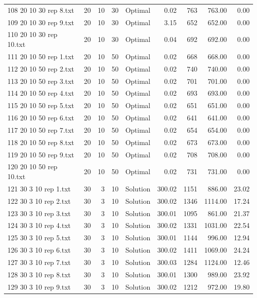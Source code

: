 \begin{longtable}{lrrllrrrr}
108 20 10 30 rep 8.txt & 20 & 10 & 30 & Optimal &  0.02 & 763 & 763.00 &  0.00\\
109 20 10 30 rep 9.txt & 20 & 10 & 30 & Optimal &  3.15 & 652 & 652.00 &  0.00\\
110 20 10 30 rep 10.txt & 20 & 10 & 30 & Optimal &  0.04 & 692 & 692.00 &  0.00\\
111 20 10 50 rep 1.txt & 20 & 10 & 50 & Optimal &  0.02 & 668 & 668.00 &  0.00\\
112 20 10 50 rep 2.txt & 20 & 10 & 50 & Optimal &  0.02 & 740 & 740.00 &  0.00\\
113 20 10 50 rep 3.txt & 20 & 10 & 50 & Optimal &  0.02 & 701 & 701.00 &  0.00\\
114 20 10 50 rep 4.txt & 20 & 10 & 50 & Optimal &  0.02 & 693 & 693.00 &  0.00\\
115 20 10 50 rep 5.txt & 20 & 10 & 50 & Optimal &  0.02 & 651 & 651.00 &  0.00\\
116 20 10 50 rep 6.txt & 20 & 10 & 50 & Optimal &  0.02 & 641 & 641.00 &  0.00\\
117 20 10 50 rep 7.txt & 20 & 10 & 50 & Optimal &  0.02 & 654 & 654.00 &  0.00\\
118 20 10 50 rep 8.txt & 20 & 10 & 50 & Optimal &  0.02 & 673 & 673.00 &  0.00\\
119 20 10 50 rep 9.txt & 20 & 10 & 50 & Optimal &  0.02 & 708 & 708.00 &  0.00\\
120 20 10 50 rep 10.txt & 20 & 10 & 50 & Optimal &  0.02 & 731 & 731.00 &  0.00\\
121 30 3 10 rep 1.txt & 30 & 3 & 10 & Solution & 300.02 & 1151 & 886.00 & 23.02\\
122 30 3 10 rep 2.txt & 30 & 3 & 10 & Solution & 300.02 & 1346 & 1114.00 & 17.24\\
123 30 3 10 rep 3.txt & 30 & 3 & 10 & Solution & 300.01 & 1095 & 861.00 & 21.37\\
124 30 3 10 rep 4.txt & 30 & 3 & 10 & Solution & 300.02 & 1331 & 1031.00 & 22.54\\
125 30 3 10 rep 5.txt & 30 & 3 & 10 & Solution & 300.01 & 1144 & 996.00 & 12.94\\
126 30 3 10 rep 6.txt & 30 & 3 & 10 & Solution & 300.02 & 1411 & 1069.00 & 24.24\\
127 30 3 10 rep 7.txt & 30 & 3 & 10 & Solution & 300.03 & 1284 & 1124.00 & 12.46\\
128 30 3 10 rep 8.txt & 30 & 3 & 10 & Solution & 300.01 & 1300 & 989.00 & 23.92\\
129 30 3 10 rep 9.txt & 30 & 3 & 10 & Solution & 300.02 & 1212 & 972.00 & 19.80\\

\end{longtable}
